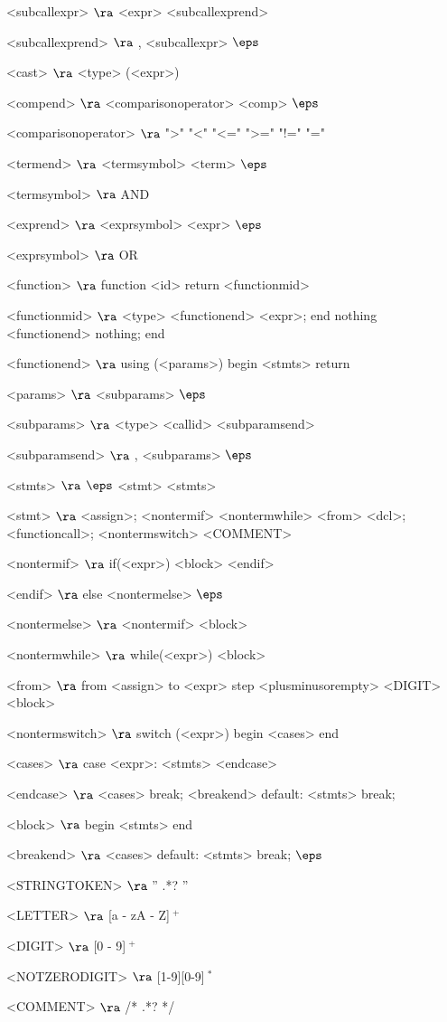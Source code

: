 \begin{grammar}
<subcallexpr> $\ra$ <expr> <subcallexprend>

<subcallexprend> $\ra$ , <subcallexpr>
\alt$\eps$

<cast> $\ra$ <type> (<expr>)

<compend> $\ra$ <comparisonoperator> <comp>
\alt$\eps$

<comparisonoperator> $\ra$ ">"
				\alt "<"
				\alt "<="
				\alt ">="
				\alt "!="
				\alt "="

<termend> $\ra$ <termsymbol> <term>
\alt$\eps$

<termsymbol> $\ra$ AND 

<exprend> $\ra$ <exprsymbol> <expr>
\alt$\eps$

<exprsymbol> $\ra$ OR 

<function> $\ra$ function <id> return <functionmid>

<functionmid> $\ra$ <type> <functionend> <expr>; end
\alt nothing <functionend> nothing; end

<functionend> $\ra$
using (<params>)
begin
	<stmts>
	return

<params> $\ra$ <subparams>
	\alt$\eps$

<subparams> $\ra$ <type> <callid> <subparamsend>

<subparamsend> $\ra$ , <subparams>
\alt$\eps$

<stmts> $\ra$ $\eps$
	\alt <stmt> <stmts>

<stmt> $\ra$ <assign>;
	\alt <nontermif>
	\alt <nontermwhile>
	\alt <from>
	\alt <dcl>;
	\alt <functioncall>;
	\alt <nontermswitch>
	\alt <COMMENT>
	
<nontermif> $\ra$ if(<expr>)
	<block>
	<endif>

<endif> $\ra$ 
	else <nontermelse>
	\alt$\eps$

<nontermelse> $\ra$ <nontermif>
	\alt <block>

<nontermwhile> $\ra$ while(<expr>)
		<block>
		
<from> $\ra$ from <assign> to <expr> step <plusminusorempty> <DIGIT>
	<block>

<nontermswitch> $\ra$ switch (<expr>)
		begin
			<cases>
		end

<cases> $\ra$ case <expr>:
			<stmts>
		<endcase>
		
<endcase> $\ra$ <cases>
		\alt break; <breakend>
		\alt default:
			<stmts>
			break;

<block> $\ra$ 
	begin
		<stmts>
	end

<breakend> $\ra$ <cases>
\alt default:
<stmts>
break;
\alt$\eps$

<STRINGTOKEN> $\ra$ '' .*? '' 

<LETTER> $\ra$ [a - zA - Z]$~^+$

<DIGIT> $\ra$ [0 - 9]$~^+$

<NOTZERODIGIT> $\ra$ [1-9][0-9]$~^*$

<COMMENT> $\ra$ /* .*? */


\end{grammar}